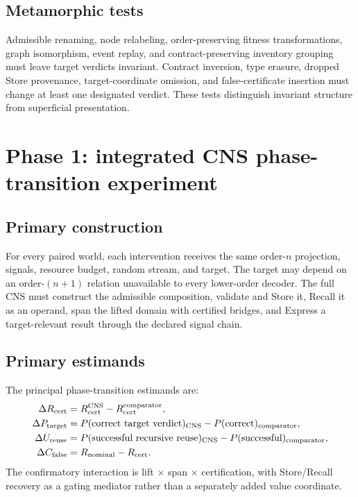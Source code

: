 \documentclass[11pt]{article}
\newcommand{\CNS}{\mathrm{CNS}}
\begin{document}
\subsection{Metamorphic tests}

Admissible renaming, node relabeling, order-preserving fitness transformations, graph isomorphism, event replay, and contract-preserving inventory grouping must leave target verdicts invariant. Contract inversion, type erasure, dropped Store provenance, target-coordinate omission, and false-certificate insertion must change at least one designated verdict. These tests distinguish invariant structure from superficial presentation.

\section{Phase 1: integrated CNS phase-transition experiment}

\subsection{Primary construction}

For every paired world, each intervention receives the same order-$n$ projection, signals, resource budget, random stream, and target. The target may depend on an order-$(n+1)$ relation unavailable to every lower-order decoder. The full CNS must construct the admissible composition, validate and Store it, Recall it as an operand, span the lifted domain with certified bridges, and Express a target-relevant result through the declared signal chain.

\subsection{Primary estimands}

The principal phase-transition estimands are:
\begin{align}
\Delta R_{\rm cert}&=R_{\rm cert}^{\CNS}-R_{\rm cert}^{\rm comparator},\\
\Delta P_{\rm target}&=P(\text{correct target verdict})_{\CNS}-P(\text{correct})_{\rm comparator},\\
\Delta U_{\rm reuse}&=P(\text{successful recursive reuse})_{\CNS}-P(\text{successful})_{\rm comparator},\\
\Delta C_{\rm false}&=R_{\rm nominal}-R_{\rm cert}.
\end{align}
The confirmatory interaction is lift $\times$ span $\times$ certification, with Store/Recall recovery as a gating mediator rather than a separately added value coordinate.
\end{document}
